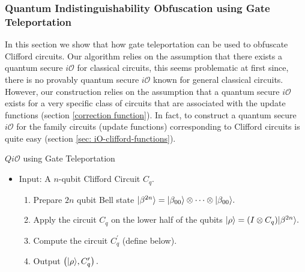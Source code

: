 \subsubsection{Quantum Indistinguishability Obfuscation using Gate Teleportation}
\label{sec:Clifford-iO-teleportaion}
In this section we  show that how gate teleportation can be used to obfuscate Clifford circuits. Our algorithm relies on the assumption that there exists a quantum secure $i\mathcal{O}$ for classical circuits, this seems problematic at first since, there is no provably quantum secure $i\mathcal{O}$ known for general classical circuits. However,  our construction relies on the assumption that a quantum secure $i\mathcal{O}$ exists for a very specific class of circuits that are associated with the update functions (section \ref{correction function}). In fact,  to construct a quantum secure $i\mathcal{O}$ for the family circuits (update functions) corresponding to Clifford circuits is quite easy (section \ref{sec: iO-clifford-functions}).



\begin{algorithm}[H]
   \caption{$Qi\mathcal{O}$ using Gate Teleportation}
  \begin{itemize}
  \item Input: A $n$-qubit Clifford Circuit $C_q.$
  \begin{enumerate}
  \item Prepare $2n$ qubit Bell state ${\lvert}\beta^{ 2n}\rangle={\lvert}\beta_{00}\rangle\otimes \cdots \otimes {\lvert}\beta_{00}\rangle.$
  \item Apply the circuit $C_q$ on the lower half of the qubits ${\lvert}\rho\rangle=(I\otimes C_q) {\lvert}\beta^{2n}\rangle.$
  \item Compute the circuit $C_q^\prime$ (define below).
  \item Output $\left({\lvert}\rho\rangle,C_q^\prime \right).$
  \end{enumerate}
  \end{itemize}
\end{algorithm}



